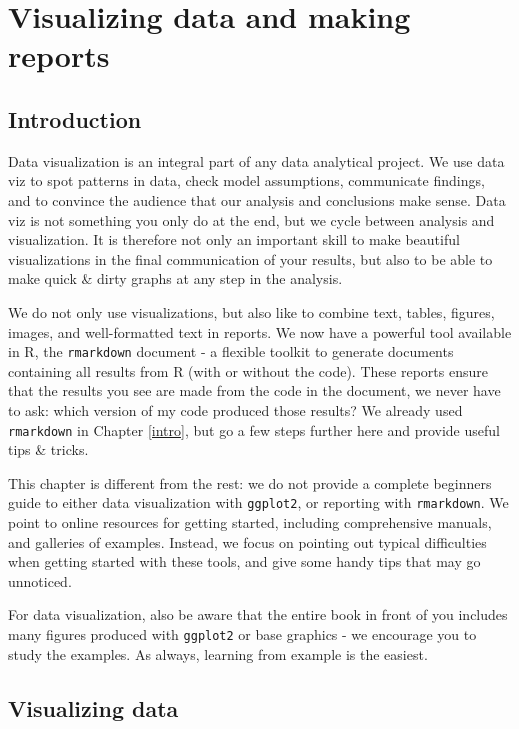 \documentclass[]{book}
\begin{document}
\hypertarget{reporting}{%
\chapter{Visualizing data and making reports}\label{reporting}}

\hypertarget{introduction-1}{%
\section{Introduction}\label{introduction-1}}

Data visualization is an integral part of any data analytical project. We use data viz to spot patterns in data, check model assumptions, communicate findings, and to convince the audience that our analysis and conclusions make sense. Data viz is not something you only do at the end, but we cycle between analysis and visualization. It is therefore not only an important skill to make beautiful visualizations in the final communication of your results, but also to be able to make quick \& dirty graphs at any step in the analysis.

We do not only use visualizations, but also like to combine text, tables, figures, images, and well-formatted text in reports. We now have a powerful tool available in R, the \texttt{rmarkdown} document - a flexible toolkit to generate documents containing all results from R (with or without the code). These reports ensure that the results you see are made from the code in the document, we never have to ask: which version of my code produced those results? We already used \texttt{rmarkdown} in Chapter \ref{intro}, but go a few steps further here and provide useful tips \& tricks.

This chapter is different from the rest: we do not provide a complete beginners guide to either data visualization with \texttt{ggplot2}, or reporting with \texttt{rmarkdown}. We point to online resources for getting started, including comprehensive manuals, and galleries of examples. Instead, we focus on pointing out typical difficulties when getting started with these tools, and give some handy tips that may go unnoticed.

For data visualization, also be aware that the entire book in front of you includes many figures produced with \texttt{ggplot2} or base graphics - we encourage you to study the examples. As always, learning from example is the easiest.

\hypertarget{visualizing}{%
\section{Visualizing data}\label{visualizing}}
\end{document}
